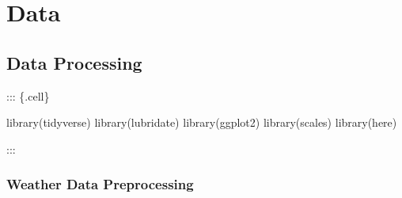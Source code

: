 \documentclass[
  letterpaper,
  DIV=11,
  numbers=noendperiod]{scrreprt}
\newenvironment{Shaded}{\begin{snugshade}}{\end{snugshade}}
\newcommand{\FunctionTok}[1]{\textcolor[rgb]{0.28,0.35,0.67}{#1}}
\newcommand{\NormalTok}[1]{\textcolor[rgb]{0.00,0.23,0.31}{#1}}
\begin{document}

\chapter{Data}\label{data}

\section{Data Processing}\label{data-processing}

::: \{.cell\}

\begin{Shaded}
\begin{Highlighting}[]
\FunctionTok{library}\NormalTok{(tidyverse)}
\FunctionTok{library}\NormalTok{(lubridate)}
\FunctionTok{library}\NormalTok{(ggplot2)}
\FunctionTok{library}\NormalTok{(scales)}
\FunctionTok{library}\NormalTok{(here)}
\end{Highlighting}
\end{Shaded}

:::

\subsection{Weather Data
Preprocessing}\label{weather-data-preprocessing}
\end{document}
